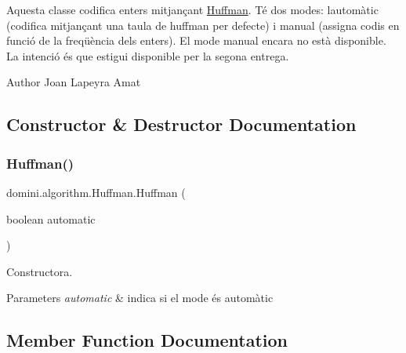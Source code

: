 Aquesta classe codifica enters mitjançant \hyperlink{classdomini_1_1algorithm_1_1Huffman}{Huffman}. Té dos modes\+: l\textquotesingle{}automàtic (codifica mitjançant una taula de huffman per defecte) i manual (assigna codis en funció de la freqüència dels enters). El mode manual encara no està disponible. La intenció és que estigui disponible per la segona entrega.

\begin{DoxyAuthor}{Author}
Joan Lapeyra Amat 
\end{DoxyAuthor}


\subsection{Constructor \& Destructor Documentation}
\mbox{\label{classdomini_1_1algorithm_1_1Huffman_ad5963e423f25e932ed78779bc000edaf}} 
\subsubsection{\texorpdfstring{Huffman()}{Huffman()}}
{\footnotesize\ttfamily domini.\+algorithm.\+Huffman.\+Huffman (\begin{DoxyParamCaption}\item[{boolean}]{automatic }\end{DoxyParamCaption})\hspace{0.3cm}{\ttfamily [inline]}}



Constructora. 


\begin{DoxyParams}{Parameters}
{\em automatic} & indica si el mode és automàtic \\
\hline
\end{DoxyParams}


\subsection{Member Function Documentation}
\mbox{\label{classdomini_1_1algorithm_1_1Huffman_a6ff0cdc5b992431ccfe8d77971ebf5e8}} 
